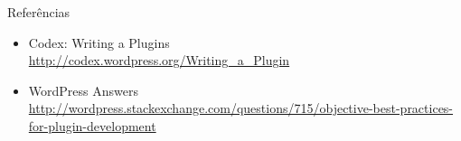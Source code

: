 \documentclass{beamer}
\begin{document}
\begin{frame}{Referências}
\begin{itemize}
  \item Codex: Writing a Plugins \\
    \url{http://codex.wordpress.org/Writing_a_Plugin}
  \item WordPress Answers
    \url{http://wordpress.stackexchange.com/questions/715/objective-best-practices-for-plugin-development}
\end{itemize}
\end{frame}
\end{document}
